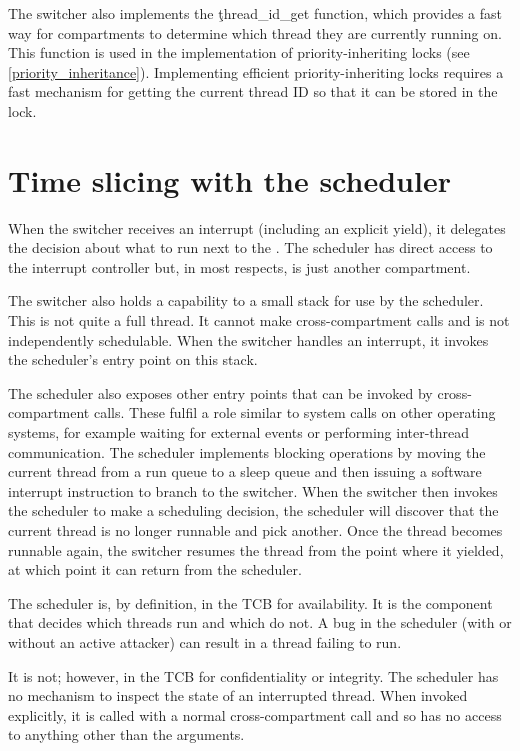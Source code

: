 The switcher also implements the \c{thread_id_get} function, which provides a fast way for compartments to determine which thread they are currently running on.
This function is used in the implementation of priority-inheriting locks (see \ref{priority_inheritance}).
Implementing efficient priority-inheriting locks requires a fast mechanism for getting the current thread ID so that it can be stored in the lock.


\section{Time slicing with the scheduler}

When the switcher receives an interrupt (including an explicit yield), it delegates the decision about what to run next to the .
The scheduler has direct access to the interrupt controller but, in most respects, is just another compartment.

The switcher also holds a capability to a small stack for use by the scheduler.
This is not quite a full thread.
It cannot make cross-compartment calls and is not independently schedulable.
When the switcher handles an interrupt, it invokes the scheduler's entry point on this stack.

The scheduler also exposes other entry points that can be invoked by cross-compartment calls.
These fulfil a role similar to system calls on other operating systems, for example waiting for external events or performing inter-thread communication.
The scheduler implements blocking operations by moving the current thread from a run queue to a sleep queue and then issuing a software interrupt instruction to branch to the switcher.
When the switcher then invokes the scheduler to make a scheduling decision, the scheduler will discover that the current thread is no longer runnable and pick another.
Once the thread becomes runnable again, the switcher resumes the thread from the point where it yielded, at which point it can return from the scheduler.

The scheduler is, by definition, in the TCB for availability.
It is the component that decides which threads run and which do not.
A bug in the scheduler (with or without an active attacker) can result in a thread failing to run.

It is not; however, in the TCB for confidentiality or integrity.
The scheduler has no mechanism to inspect the state of an interrupted thread.
When invoked explicitly, it is called with a normal cross-compartment call and so has no access to anything other than the arguments.

